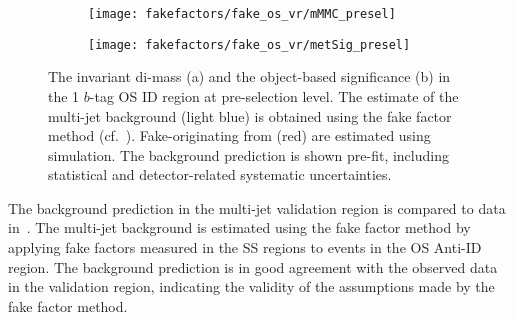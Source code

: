 \begin{figure}[htbp]
  \centering

  \begin{subfigure}{0.45\textwidth}
    \texttt{[image: fakefactors/fake\_os\_vr/mMMC\_presel]}
    \subcaption{}
  \end{subfigure}\hspace*{0.04\textwidth}%
  \begin{subfigure}{0.45\textwidth}
    \texttt{[image: fakefactors/fake\_os\_vr/metSig\_presel]}
    \subcaption{}
  \end{subfigure}

  \caption{The invariant di-\tauhad mass (a) and the object-based
    \pTmissAbs significance (b) in the 1 $b$-tag OS ID region at
    pre-selection level. The estimate of the multi-jet background
    (light blue) is obtained using the fake factor method (cf.\
    ). Fake-\tauhadvis originating from
    \ttbar (red) are estimated using simulation. The background
    prediction is shown pre-fit, including statistical and
    detector-related systematic uncertainties.}
  \label{fig:fake_factor_OSVR_cutvars}
\end{figure}

The background prediction in the multi-jet validation region is
compared to data in~. The
multi-jet background is estimated using the fake factor method by
applying fake factors measured in the SS regions to events in the OS
Anti-ID region. The background prediction is in good agreement with
the observed data in the validation region, indicating the validity of
the assumptions made by the fake factor method.

